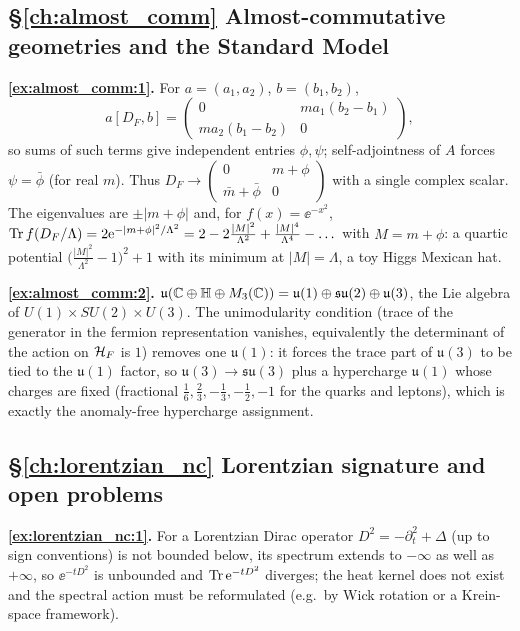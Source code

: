 {\subsection*{\S\ref{ch:almost_comm} Almost-commutative geometries and the Standard Model}
\textbf{\ref{ex:almost_comm:1}.} For $a=(a_1,a_2)$, $b=(b_1,b_2)$, \[a[D_F,b]=\begin{pmatrix}0&ma_1(b_2-b_1)\\ma_2(b_1-b_2)&0\end{pmatrix},\] so sums of such terms give independent entries $\phi,\psi$; self-adjointness of $A$ forces $\psi=\bar\phi$ (for real $m$). Thus $D_F\to\begin{pmatrix}0&m+\phi\\\bar m+\bar\phi&0\end{pmatrix}$ with a single complex scalar. The eigenvalues are $\pm|m+\phi|$ and, for $f(x)=\ee^{-x^2}$, $\operatorname{Tr} f(D_F/\Lambda)=2\mathrm{e}^{-|m+\phi|^2/\Lambda^2}=2-2\frac{|M|^2}{\Lambda^2}+\frac{|M|^4}{\Lambda^4}-\dots$ with $M=m+\phi$: a quartic potential $\big(\frac{|M|^2}{\Lambda^2}-1\big)^2+1$ with its minimum at $|M|=\Lambda$, a toy Higgs Mexican hat.\par
\textbf{\ref{ex:almost_comm:2}.} $\mathfrak u(\mathbb{C}\oplus\mathbb H\oplus M_3(\mathbb{C}))=\mathfrak u(1)\oplus\mathfrak{su}(2)\oplus\mathfrak u(3)$, the Lie algebra of $U(1)\times SU(2)\times U(3)$. The unimodularity condition (trace of the generator in the fermion representation vanishes, equivalently the determinant of the action on $\mathcal{H}_F$ is $1$) removes one $\mathfrak u(1)$: it forces the trace part of $\mathfrak u(3)$ to be tied to the $\mathfrak u(1)$ factor, so $\mathfrak u(3)\to\mathfrak{su}(3)$ plus a hypercharge $\mathfrak u(1)$ whose charges are fixed (fractional $\frac16,\frac23,-\frac13,-\frac12,-1$ for the quarks and leptons), which is exactly the anomaly-free hypercharge assignment.\par

\subsection*{\S\ref{ch:lorentzian_nc} Lorentzian signature and open problems}
\textbf{\ref{ex:lorentzian_nc:1}.} For a Lorentzian Dirac operator $D^2=-\partial_t^2+\Delta$ (up to sign conventions) is not bounded below, its spectrum extends to $-\infty$ as well as $+\infty$, so $\ee^{-tD^2}$ is unbounded and $\operatorname{Tr}\mathrm{e}^{-tD^2}$ diverges; the heat kernel does not exist and the spectral action must be reformulated (e.g.\ by Wick rotation or a Krein-space framework).\par

}
